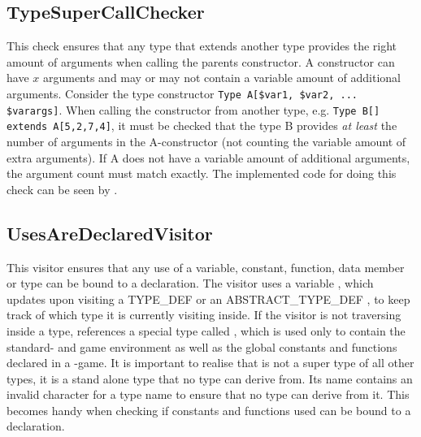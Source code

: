 \subsection{TypeSuperCallChecker}
This check ensures that any type that extends another type provides the right amount of arguments when calling the parents constructor. A constructor can have $x$ arguments and may or may not contain a variable amount of additional arguments. Consider the type constructor \texttt{Type A[\$var1, \$var2, ... \$varargs]}. When calling the constructor from another type, e.g. \texttt{Type B[] extends A[5,2,7,4]}, it must be checked that the type B provides \textit{at least} the number of arguments in the A-constructor (not counting the variable amount of extra arguments). If A does not have a variable amount of additional arguments, the argument count must match exactly. The implemented code for doing this check can be seen by .



\subsection{UsesAreDeclaredVisitor}
\label{sec:usesaredeclaredvisitor}
This visitor ensures that any use of a variable, constant, function, data member or type can be bound to a declaration. The visitor uses a variable  , which updates upon visiting a TYPE\_DEF or an ABSTRACT\_TYPE\_DEF , to keep track of which type it is currently visiting inside. If the visitor is not traversing inside a type,   references a special type called , which is used only to contain the standard- and game environment as well as the global constants and functions declared in a \productname{}-game. It is important to realise that  is not a super type of all other types, it is a stand alone type that no type can derive from. Its name contains an invalid character for a type name to ensure that no type can derive from it. This becomes handy when checking if constants and functions used can be bound to a declaration.

